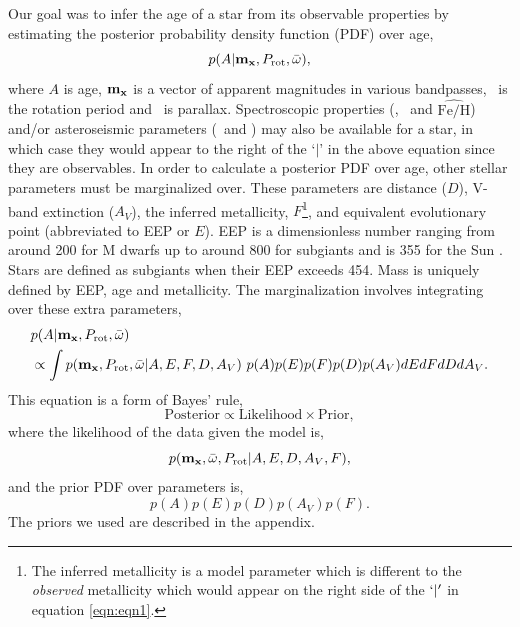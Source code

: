 Our goal was to infer the age of a star from its observable properties by
estimating the posterior probability density function (PDF) over age,
\begin{equation} \label{eqn:eqn1}
    p(A|{\bf m_x}, P_{\mathrm{rot}}, \bar{\omega}),
\end{equation}
where $A$ is age, ${\bf m_x}$ is a vector of
apparent magnitudes in various bandpasses,
\prot\ is the rotation period and \pmega\ is parallax.
Spectroscopic properties (\teff, \logg\ and $\hat{\mathrm{Fe/H}}$) and/or
asteroseismic parameters (\dnu\ and \numax) may also be available for a star,
in which case they would appear to the right of the `$|$' in the above
equation since they are observables.
In order to calculate a posterior PDF over age, other stellar parameters must
be marginalized over.
These parameters are distance ($D$), V-band extinction ($A_V$), the
inferred metallicity, $F$\footnote{The inferred metallicity is a
model parameter which is different to the {\it observed} metallicity which
would appear on the right side of the $`|'$ in equation \ref{eqn:eqn1}.},
and equivalent evolutionary point (abbreviated to EEP or
$E$).
EEP is a dimensionless number ranging from around 200 for M dwarfs up
to around 800 for subgiants and is 355 for the Sun \citep[see][]{dotter2016,
choi2016}.
Stars are defined as subgiants when their EEP exceeds 454.
Mass is uniquely defined by EEP, age and metallicity.
The marginalization involves integrating over these extra parameters,
\begin{eqnarray} \label{eqn:bayes}
    & p(A|{\bf m_x},
    P_{\mathrm{rot}}, \bar{\omega})
\\ \nonumber
    & \propto \int p({\bf m_x},
    P_\mathrm{rot}, \bar{\omega}|
    A, E, F, D, A_V)~p(A)p(E)p(F)p(D)p(A_V)dEdFdDdA_V.
\end{eqnarray}
This equation is a form of Bayes' rule,
\begin{equation} \label{eqn:eqn2}
\mathrm{Posterior} \propto \mathrm{Likelihood} \times \mathrm{Prior},
\end{equation}
where the likelihood of the data given the model is,
\begin{equation} \label{eqn:full_likelihood}
    p({\bf m_x}, \bar{\omega}, P_{\mathrm{rot}}|A, E, D, A_V, F),
\end{equation}
and the prior PDF over parameters is,
\begin{equation} \label{eqn:prior}
    p(A)p(E)p(D)p(A_V)p(F).
\end{equation}
The priors we used are described in the appendix.

